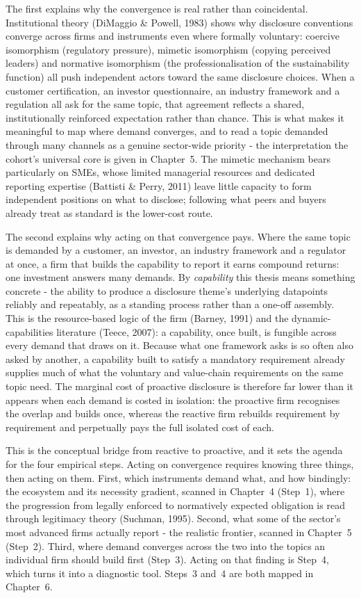 \documentclass[
]{article}
\begin{document}
The first explains why the convergence is real rather than coincidental.
Institutional theory (DiMaggio \& Powell, 1983) shows why disclosure conventions
converge across firms and instruments even where formally voluntary: coercive
isomorphism (regulatory pressure), mimetic isomorphism (copying perceived leaders)
and normative isomorphism (the professionalisation of the sustainability function)
all push independent actors toward the same disclosure choices. When a customer
certification, an investor questionnaire, an industry framework and a regulation
all ask for the same topic, that agreement reflects a shared, institutionally
reinforced expectation rather than chance. This is what makes it meaningful to map
where demand converges, and to read a topic demanded through many channels as a
genuine sector-wide priority - the interpretation the cohort's universal core is
given in Chapter~5. The mimetic mechanism bears particularly on SMEs, whose
limited managerial resources and dedicated reporting expertise (Battisti \&
Perry, 2011) leave little capacity to form independent positions on what to
disclose; following what peers and buyers already treat as standard is the
lower-cost route.

The second explains why acting on that convergence pays. Where the same topic is
demanded by a customer, an investor, an industry framework and a regulator at once,
a firm that builds the capability to report it earns compound returns: one
investment answers many demands. By \emph{capability} this thesis means something
concrete - the ability to produce a disclosure theme's underlying datapoints
reliably and repeatably, as a standing process rather than a one-off assembly. This
is the resource-based logic of the firm (Barney, 1991) and the dynamic-capabilities
literature (Teece, 2007): a capability, once built, is fungible across every demand
that draws on it. Because what one framework asks is so often also asked by another,
a capability built to satisfy a mandatory requirement already supplies much of what
the voluntary and value-chain requirements on the same topic need. The marginal
cost of proactive disclosure is therefore far lower than it appears when each
demand is costed in isolation: the proactive firm recognises the overlap and builds
once, whereas the reactive firm rebuilds requirement by requirement and perpetually
pays the full isolated cost of each.

This is the conceptual bridge from reactive to proactive, and it sets the agenda
for the four empirical steps. Acting on convergence requires knowing three things,
then acting on them. First, which instruments demand what, and how bindingly: the
ecosystem and its necessity gradient, scanned in Chapter~4 (Step~1), where the
progression from legally enforced to normatively expected obligation is read
through legitimacy theory (Suchman, 1995). Second, what some of the sector's most
advanced firms actually report - the realistic frontier, scanned in Chapter~5 (Step~2).
Third, where demand converges across the two into the topics an individual firm
should build first (Step~3). Acting on that finding is Step~4, which turns it into
a diagnostic tool. Steps~3 and~4 are both mapped in Chapter~6.
\end{document}
